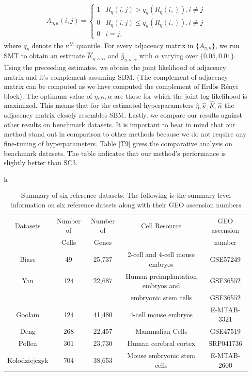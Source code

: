 \documentclass[11pt]{article}
\newcommand{\be}{\begin{eqnarray}}
\newcommand{\ee}{\end{eqnarray}}
\begin{document}
\be
A_{\eta, \kappa}(i,j) = \begin{cases}
1 & R_{\eta}(i,j) > q_{\kappa}(R_{\eta}(i,)), i \neq j \\
0 & R_{\eta}(i,j) \le q_{\kappa}(R_{\eta}(i,)), i \neq j \\
0 & i=j,
\end{cases}
\ee
where $q_{\kappa}$ denote the $\kappa^{th}$ quantile.
For every adjacency matrix in $\{ A_{\eta, \kappa}\}$, we run SMT to obtain an estimate $\hat{K}_{\eta, \kappa, \alpha}$ and $\hat{g}_{\eta, \kappa, \alpha}$ with $\alpha$ varying over $\{0.05, 0.01 \}$. Using the preceeding estimates, we obtain the joint likelihood of adjacency matrix and it's complement assuming SBM. (The complement of adjacency matrix can be computed as we have computed the complement of Erd\"{o}s R\'{e}nyi block). The optimum value of $\eta, \kappa, \alpha$ are those for which the joint log likelihood is maximized. This means that for the estimated hyperparameters $\hat{\eta}, \hat{\kappa}, \hat{K}, \hat{\alpha}$ the adjacency matrix closely resembles SBM. Lastly, we compare our results against other results on benchmark  datasets. It is important to bear in mind that our method stand out in comparison to other methods because we do not require any fine-tuning of hyperparameters. Table \ref{T9} gives the comparative analysis on benchmark datasets. The table indicates that our method's performance is slightly better than SC3.

\begin{table}{h}
\centering
\caption{Summary of six reference datasets. The following is the summary level information on six reference datsets along with their GEO ascension numbers}\label{T8}
\begin{tabular}{| c | c | c | c | c |}
\hline
Datasets & Number of & Number of & Cell Resource & GEO ascension \\
 & Cells & Genes &  & number \\
\hline
Biase & 49 & 25,737 & 2-cell and 4-cell mouse embryos & GSE57249 \\
Yan & 124 & 22,687 & Human preimplantation embryos and & GSE36552 \\
 & & & embryonic stem cells & GSE36552 \\
Goolam & 124 & 41,480 & 4-cell mouse embryos & E-MTAB-3321 \\
Deng & 268 & 22,457 & Mammalian Cells & GSE47519 \\
Pollen & 301 & 23,730 & Human cerebral cortex & SRP041736 \\
Kolodziejczyk & 704 & 38,653 & Mouse embryonic stem cells & E-MTAB-2600\\
\hline
\end{tabular}
\end{table}
\end{document}
